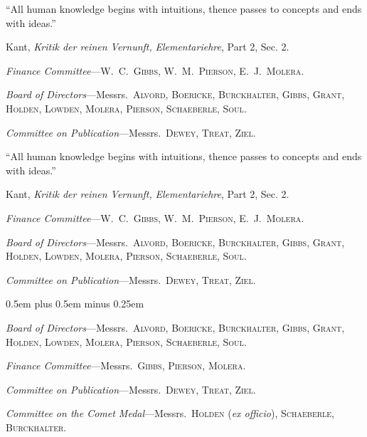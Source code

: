 \documentclass[11pt]{tufte-book}
\def\compactlist {\begin{list}{}{\leftmargin \parindent \itemindent -\parindent \itemsep 0pt \parsep 0pt}}
\def\compactlisttwo {\begin{list}{}{\leftmargin \parindent \itemindent -\parindent \itemsep 1pt \parsep 1pt}}
\def\stretchyspace{\spaceskip0.5em plus 0.5em minus 0.25em}
\begin{document}
\begin{flushright}
  \parbox{3in}{\setlength{\parindent}{1em}
  ``All human knowledge begins with intuitions,
  thence passes to concepts and
  ends with ideas.''}
\end{flushright}
\begin{flushright}
  \parbox{2.5in}{\setlength{\parindent}{1em}
  Kant, \emph{Kritik der reinen Vernunft,}
  \emph{Elementariehre}, Part 2, Sec. 2.}
\end{flushright}



\compactlisttwo
\item \textit{Finance Committee}---\textsc{W.~C.~Gibbs, W.\ M.\ Pierson, E.\ J.\ Molera}.
\item \textit{Board of Directors}---Messrs.\ \textsc{Alvord, Boericke, Burckhalter, Gibbs,
Grant, Holden, Lowden, Molera, Pierson, Schaeberle, Soul}.
\item \textit{Committee on Publication}---Messrs.\ \textsc{Dewey, Treat, Ziel}.
\end{list}

\begin{flushright}
  \parbox{3in}{\setlength{\parindent}{1em}
  ``All human knowledge begins with intuitions,
  thence passes to concepts and
  ends with ideas.''}
\end{flushright}
\begin{flushright}


  \parbox{2.5in}{\setlength{\parindent}{1em}
  Kant, \emph{Kritik der reinen Vernunft,}
  \emph{Elementariehre}, Part 2, Sec. 2.}
\end{flushright}
\compactlist
\item \textit{Finance Committee}---\textsc{W.\ C.\ Gibbs, W.\ M.\ Pierson, E.\ J.\ Molera}.
\item \textit{Board of Directors}---Messrs.\ \textsc{Alvord, Boericke, Burckhalter, Gibbs,
Grant, Holden, Lowden, Molera, Pierson, Schaeberle, Soul}.
\item \textit{Committee on Publication}---Messrs.\ \textsc{Dewey, Treat, Ziel}.
\end{list}

\compactlisttwo\stretchyspace
\item[] \textit{Board of Directors}---Messrs.\ \textsc{Alvord, Boericke, Burckhalter, Gibbs,
Grant, Holden, Lowden, Molera, Pierson, Schaeberle, Soul}.
\item[]\textit{Finance Committee}---Messrs.\ \textsc{Gibbs, Pierson, Molera}.
\item[]\textit{Committee on Publication}---Messrs.\ \textsc{Dewey, Treat, Ziel}.
\item[]\textit{Committee on the Comet Medal}---Messrs.\ \textsc{Holden} (\textit{ex officio}), %
\textsc{Schaeberle}, \textsc{Burckhalter}.
\end{list}
\end{document}
